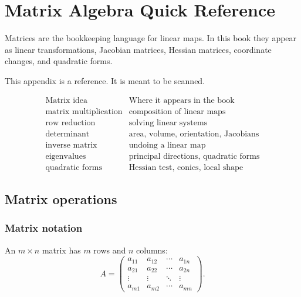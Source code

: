 
\chapter{Matrix Algebra Quick Reference}
\label{app:matrix-algebra-reference}

Matrices are the bookkeeping language for linear maps.  In this book they appear as
linear transformations, Jacobian matrices, Hessian matrices, coordinate changes, and
quadratic forms.

This appendix is a reference.  It is meant to be scanned.

\[
\begin{array}{c|c}
\text{Matrix idea} & \text{Where it appears in the book} \\ \hline
\text{matrix multiplication} & \text{composition of linear maps}\\[1mm]
\text{row reduction} & \text{solving linear systems}\\[1mm]
\text{determinant} & \text{area, volume, orientation, Jacobians}\\[1mm]
\text{inverse matrix} & \text{undoing a linear map}\\[1mm]
\text{eigenvalues} & \text{principal directions, quadratic forms}\\[1mm]
\text{quadratic forms} & \text{Hessian test, conics, local shape}
\end{array}
\]

\section{Matrix operations}
\label{app:C.1}

\subsection*{Matrix notation}

An \(m\times n\) matrix has \(m\) rows and \(n\) columns:
\[
\boxed{
    A=
    \begin{pmatrix}
    a_{11} & a_{12} & \cdots & a_{1n}\\
    a_{21} & a_{22} & \cdots & a_{2n}\\
    \vdots & \vdots & \ddots & \vdots\\
    a_{m1} & a_{m2} & \cdots & a_{mn}
    \end{pmatrix}.
}
\]

